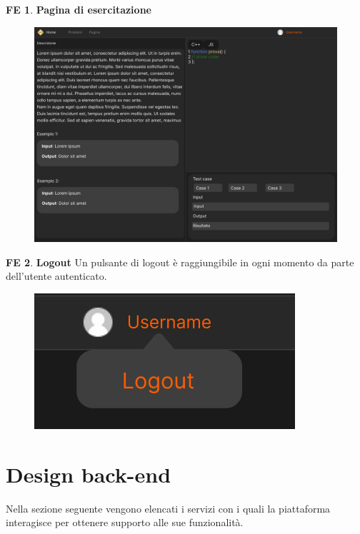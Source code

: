 \documentclass[11pt, a4paper]{article}
\theoremstyle{definition}
\newtheorem{frontend}{FE}
\begin{document}
\begin{frontend}
\textbf{Pagina di esercitazione }

\end{frontend}
\begin{figure}[H]
\centering
\includegraphics[scale=0.2]{materiale/immaginife/esercitazione.jpeg}
\end{figure}

\begin{frontend}
\textbf{Logout }
Un pulsante di logout è raggiungibile in ogni momento da parte dell'utente
autenticato.
\end{frontend}
\begin{figure}[H]
\centering
\includegraphics[scale=0.3]{materiale/immaginife/logout.jpeg}
\end{figure}

\newpage
\section{Design back-end}
Nella sezione seguente vengono elencati i servizi con i quali la piattaforma
interagisce per ottenere supporto alle sue funzionalità.
\end{document}
